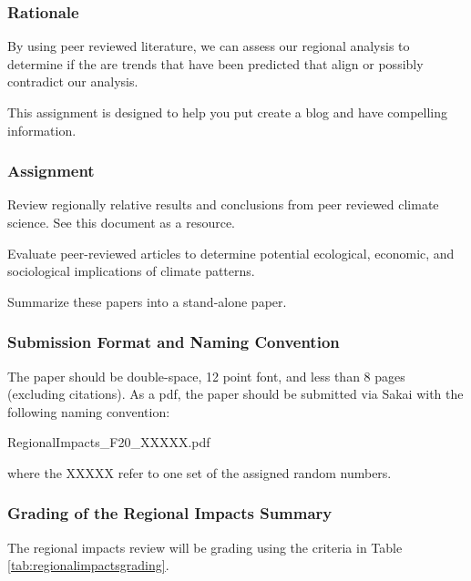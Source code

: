 
\subsubsection{Rationale}

By using peer reviewed literature, we can assess our regional analysis to determine if the are trends that have been predicted that align or possibly contradict our analysis. 

This assignment is designed to help you put create a blog and have compelling information. 

\subsubsection{Assignment}

Review regionally relative results and conclusions from peer reviewed climate science. See this document as a resource.

Evaluate peer-reviewed articles to determine potential ecological, economic, and sociological implications of climate patterns.

Summarize these papers into a stand-alone paper. 

\subsubsection{Submission Format and Naming Convention}

The paper should be double-space, 12 point font, and less than 8 pages (excluding citations). As a pdf, the paper should be submitted via Sakai with the following naming convention:

\medskip
RegionalImpacts\_F20\_XXXXX.pdf

\medskip \noindent where the XXXXX refer to one set of the assigned random numbers. 

\subsubsection{Grading of the Regional Impacts Summary}

The regional impacts review will be grading using the criteria in Table \ref{tab:regionalimpactsgrading}.

